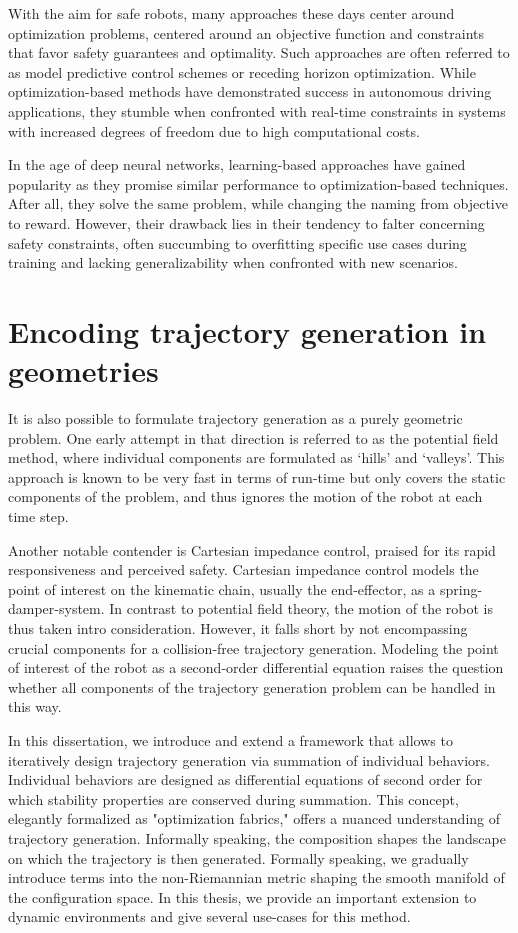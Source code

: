 With the aim for safe robots, many approaches these days
center around optimization problems, centered around an objective
function and constraints that favor safety guarantees and
optimality. Such approaches are often referred to as model
predictive control schemes or receding horizon
optimization. While optimization-based methods have
demonstrated success in autonomous driving applications,
they stumble when confronted with real-time constraints in
systems with increased degrees of freedom due to high
computational costs.

In the age of deep neural networks, learning-based approaches have gained
popularity as they promise similar performance to
optimization-based techniques. After all, they solve the
same problem, while changing the naming from objective to
reward. However, their drawback lies in their tendency to falter concerning
safety constraints, often succumbing to overfitting specific use cases during
training and lacking generalizability when confronted with new scenarios.

\section{Encoding trajectory generation in geometries}

It is also possible to formulate trajectory generation as a
purely geometric problem. One early attempt in that
direction is referred to as the potential field method,
where individual components are formulated as `hills' and
`valleys'. This approach is known to be very fast in terms
of run-time but only covers the static components of the
problem, and thus ignores the motion of the robot at each
time step.

Another notable contender is Cartesian
impedance control, praised for its rapid responsiveness and
perceived safety.
Cartesian impedance control models the point of interest
on the kinematic chain, usually the end-effector, as a
spring-damper-system. In contrast to potential field theory,
the motion of the robot is thus taken intro consideration.
However, it falls short by not encompassing crucial
components for a collision-free trajectory generation.
Modeling the point of interest of the robot as a
second-order differential equation raises the question
whether all components of the trajectory generation problem
can be handled in this way. 

In this dissertation, we introduce and extend a framework
that allows to iteratively design trajectory generation via
summation of individual behaviors. Individual behaviors are
designed as differential equations of second order for which
stability properties are conserved during summation.
This concept, elegantly formalized as "optimization
fabrics," offers a nuanced understanding of trajectory
generation. Informally speaking, the composition shapes the
landscape on which the trajectory is then generated.
Formally speaking, we gradually introduce terms into the
non-Riemannian metric shaping the smooth manifold of the
configuration space. In this thesis, we provide an important
extension to dynamic environments and give several use-cases
for this method.


